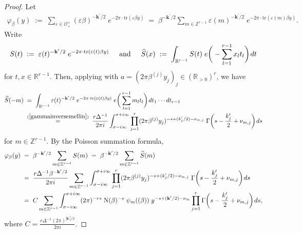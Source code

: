 \documentclass[11pt]{amsart}
\theoremstyle{remark}
\newcommand\mbf[1]{\mathbf{#1}}
\newcommand\wh[1]{\widehat{#1}}
\newcommand{\inte}{\mathbb{Z}}
\newcommand{\real}{\mathbb{R}}
\newcommand{\eps}{\varepsilon}
\newcommand{\vphi}{\varphi}
\newcommand{\clo}{\mathcal{O}}
\newcommand{\eq}{\;=\;}
\newcommand{\deq}{\;:=\;}
\def\thin{{\hskip 1pt}}
\newcommand{\N}{\mathrm{N}}
\newcommand{\tr}{\mathrm{tr}}
\begin{document}
\begin{proof}
Let
\begin{align*}
    \vphi_\beta(y)\deq\sum_{\eps\in\clo_+^\times}(\eps\beta)^{-\mbf{k}^\prime/2}\;e^{-2\pi\cdot\tr(\eps\beta y)}\eq\beta^{-\mbf{k}^\prime/2}\sum_{m\in\inte^{r-1}}\eps(m)^{-\mbf{k}^\prime/2}\;e^{-2\pi\cdot\tr(\eps(m)\beta y)}.
\end{align*}
Write
\begin{align*}
    S(t)\deq \eps(t)^{-\mbf{k}^\prime/2}\;e^{-2\pi\cdot\tr(\eps(t)\beta y)}\hspace{0.5cm}\text{and}\hspace{0.5cm}\wh{S}(x)\deq\int_{\real^{r-1}}S(t)\; e\bigg(-\sum_{l=1}^{r-1}x_lt_l\bigg)\thin dt
\end{align*}
for $t,x\in\real^{r-1}$. Then, applying  with $a=(2\pi\beta^{(j)}y_j)_j\in(\real_{>0})^r$, we have
\begin{align*}
    \wh{S}(-m)&\eq\int_{\real^{r-1}}\eps(t)^{-\mbf{k}^\prime/2}\;e^{-2\pi\cdot\tr(\eps(t)\beta y)}\; e\bigg(\sum_{l=1}^{r-1}m_lt_l\bigg)\thin dt_1\cdots dt_{r-1} \\
    &\;\stackrel{(\ref{gammainversemellin})}{=}\;\frac{r\Delta^{-1}}{2\pi i}\int_{\sigma-i\infty}^{\sigma+i\infty}\prod_{j=1}^r(2\pi\beta^{(j)}y_j)^{-s+(k_j^\prime/2)-\nu_{m,j}}\;\Gamma\bigg(s-\frac{k_j^\prime}{2}+\nu_{m,j}\bigg)\thin ds
\end{align*}
for $m\in\inte^{r-1}$. By the Poisson summation formula,
\begin{align*}
    \vphi_\beta(y)&\eq\beta^{-\mbf{k}^\prime/2}\sum_{m\in\inte^{r-1}}S(m)\eq\beta^{-\mbf{k}^\prime/2}\sum_{m\in\inte^{r-1}}\wh{S}(m) \\
    &\eq\frac{r\Delta^{-1}\beta^{-\mbf{k}^\prime/2}}{2\pi i}\sum_{m\in\inte^{r-1}}\int_{\sigma-i\infty}^{\sigma+i\infty}\prod_{j=1}^r(2\pi\beta^{(j)}y_j)^{-s+(k_j^\prime/2)-\nu_{m,j}}\;\Gamma\bigg(s-\frac{k_j^\prime}{2}+\nu_{m,j}\bigg)\thin ds \\
    &\eq C\sum_{m\in\inte^{r-1}}\int_{\sigma-i\infty}^{\sigma+i\infty}(2\pi)^{-rs}\;\N(\beta)^{-s}\;\psi_m((\beta))\;y^{-s+(\mbf{k}^\prime/2)-\nu_m}\prod_{j=1}^r\Gamma\bigg(s-\frac{k_j^\prime}{2}+\nu_{m,j}\bigg)\thin ds,
\end{align*}
where $C=\frac{r\Delta^{-1}(2\pi)^{|\mbf{k}^\prime|/2}}{2\pi i}$.
\end{proof}
\end{document}
